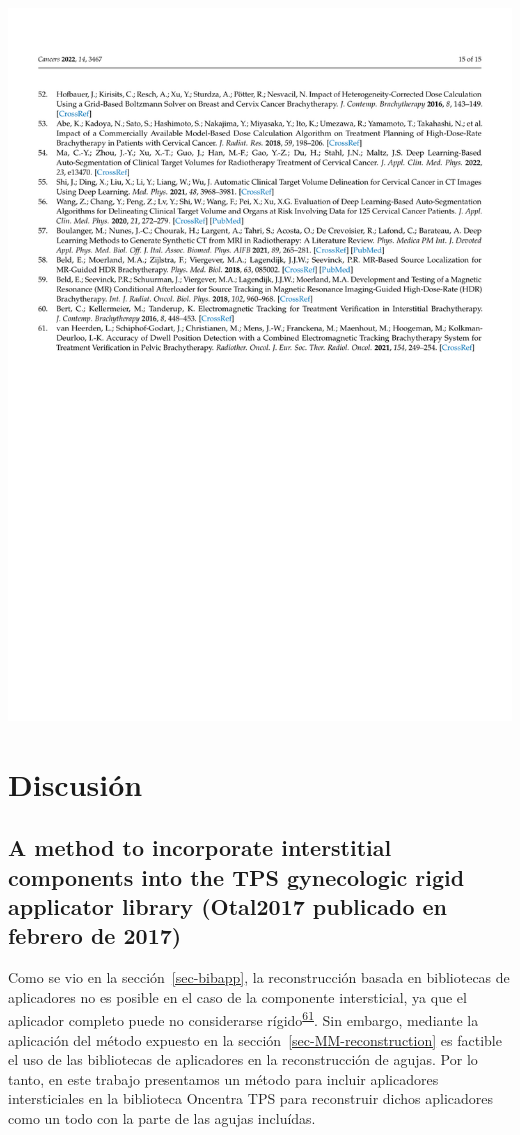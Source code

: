 \documentclass[
  a4paper,
]{scrreprt}
\begin{document}
\includegraphics{articulos/cancers/cancers-15.png}


\hypertarget{discusiuxf3n}{%
\chapter{Discusión}\label{discusiuxf3n}}

\hypertarget{sec-discusionotal2017}{%
\section{A method to incorporate interstitial components into the TPS
gynecologic rigid applicator library (Otal2017 publicado en febrero de
2017)}\label{sec-discusionotal2017}}

Como se vio en la sección~\ref{sec-bibapp}, la reconstrucción basada en
bibliotecas de aplicadores no es posible en el caso de la componente
intersticial, ya que el aplicador completo puede no considerarse
rígido\textsuperscript{\protect\hyperlink{ref-hellebust2010}{61}}. Sin
embargo, mediante la aplicación del método expuesto en la
sección~\ref{sec-MM-reconstruction} es factible el uso de las
bibliotecas de aplicadores en la reconstrucción de agujas. Por lo tanto,
en este trabajo presentamos un método para incluir aplicadores
intersticiales en la biblioteca Oncentra TPS para reconstruir dichos
aplicadores como un todo con la parte de las agujas incluídas.
\end{document}
